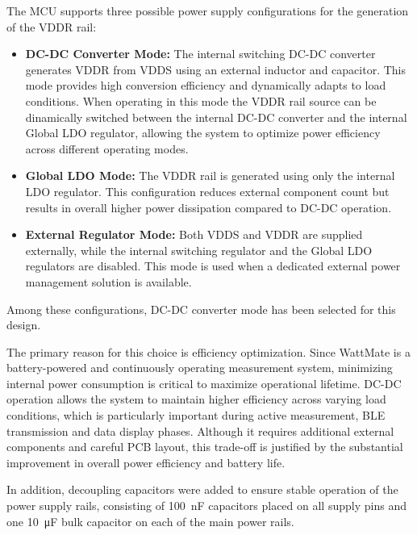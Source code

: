 \begin{itemize}
        The MCU supports three possible power supply configurations for the generation of the VDDR rail:

        \begin{itemize}
            \item \textbf{DC-DC Converter Mode:} The internal switching DC-DC converter generates VDDR from VDDS using an external inductor and capacitor. This mode provides high conversion efficiency and dynamically adapts to load conditions. When operating in this mode the VDDR rail source can be dinamically switched between the internal DC-DC converter and the internal Global LDO regulator, allowing the system to optimize power efficiency across different operating modes.

            \item \textbf{Global LDO Mode:} The VDDR rail is generated using only the internal LDO regulator. This configuration reduces external component count but results in overall higher power dissipation compared to DC-DC operation.

            \item \textbf{External Regulator Mode:} Both VDDS and VDDR are supplied externally, while the internal switching regulator and the Global LDO regulators are disabled. This mode is used when a dedicated external power management solution is available.
        \end{itemize}

        Among these configurations, DC-DC converter mode has been selected for this design.

        The primary reason for this choice is efficiency optimization. Since WattMate is a battery-powered and continuously operating measurement system, minimizing internal power consumption is critical to maximize operational lifetime. DC-DC operation allows the system to maintain higher efficiency across varying load conditions, which is particularly important during active measurement, BLE transmission and data display phases. Although it requires additional external components and careful PCB layout, this trade-off is justified by the substantial improvement in overall power efficiency and battery life.

        In addition, decoupling capacitors were added to ensure stable operation of the power supply rails, consisting of \SI{100}{\nano\farad} capacitors placed on all supply pins and one \SI{10}{\micro\farad} bulk capacitor on each of the main power rails.

\end{itemize}

